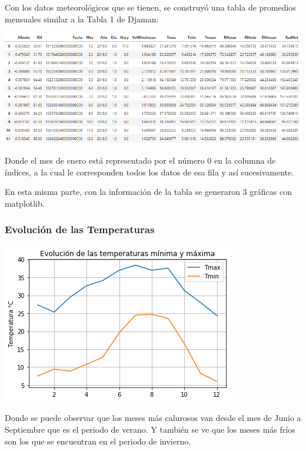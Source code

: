 \documentclass{article}
\begin{document}
Con los datos meteorológicos que se tienen, se construyó una tabla de promedios mensuales similar a la Tabla 1 de Djaman:
\begin{center}
    \includegraphics[width = \textwidth]{Tabla.png}
\end{center}
Donde el mes de enero está representado por el número 0 en la columna de índices, a la cual le corresponden todos los datos de esa fila y así sucesivamente.

En esta misma parte, con la información de la tabla se generaron 3 gráficas con matplotlib.

\subsubsection*{Evolución de las Temperaturas}
\begin{center}
    \includegraphics[scale = 0.58]{Temp.png}
\end{center}
Donde se puede observar que los meses más calurosos van desde el mes de Junio a Septiembre que es el periodo de verano. Y también se ve que los meses más fríos son los que se encuentran en el periodo de invierno.
\end{document}
